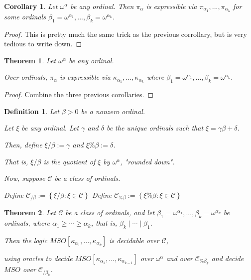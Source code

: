 \documentclass{article}
\newtheorem{theorem}{Theorem}
\newtheorem{corollary}{Corollary}
\newtheorem{definition}{Definition}
\newcommand{\brackets}[1]{\left[ {#1} \right]}
\newcommand{\braces}[1]{\left\{ {#1} \right\}}
\newcommand{\setcomp}[1]{\braces{#1}}
\newcommand{\kk}[1]{{\kappa}_{#1}}
\newcommand{\pp}[1]{{\pi}_{#1}}
\newcommand{\CC}{\mathcal{C}}
\begin{document}
\begin{corollary}
    Let $\omega^\alpha$ be any ordinal.
    Then $\pp{\alpha}$ is expressible via $\pp{\alpha_1}, ..., \pp{\alpha_k}$
    for some ordinals
    $\beta_1 = \omega^{\alpha_1}, ..., \beta_k = \omega^{\alpha_k}$.
\end{corollary}

\begin{proof}
    This is pretty much the same trick as the previous corrollary,
    but is very tedious to write down.
\end{proof}

\begin{theorem}
    Let $\omega^\alpha$ be any ordinal.

    Over ordinals, $\pp{\alpha}$ is expressible via
    $\kk{\alpha_1}, ..., \kk{\alpha_k}$
    where $\beta_1 = \omega^{\alpha_1}, ..., \beta_k = \omega^{\alpha_k}$.
\end{theorem}

\begin{proof}
    Combine the three previous corollaries.
\end{proof}

\begin{definition}
    Let $\beta > 0$ be a nonzero ordinal.

    Let $\xi$ be any ordinal.
    Let $\gamma$ and $\delta$ be the unique ordinals
    such that $\xi = \gamma \beta + \delta$.

    Then, define $\xi / \beta := \gamma$ and $\xi \% \beta := \delta$.

    That is, $\xi / \beta$ is the quotient of $\xi$ by $\omega^\alpha$, "rounded down".

    Now, suppose $\CC$ be a class of ordinals.

    Define $\CC_{/\beta} := \setcomp{\xi / \beta : \xi \in \CC}$
    Define $\CC_{\% \beta} := \setcomp{\xi \% \beta : \xi \in \CC}$

\end{definition}

\begin{theorem}
    Let $\CC$ be a class of ordinals,
    and let $\beta_1=\omega^{\alpha_1}, ..., \beta_k=\omega^{\alpha_k}$ be ordinals,
    where $\alpha_1 \ge \cdots \ge \alpha_k$, that is, $\beta_k \mid \cdots \mid \beta_1$.
    
    Then the logic $MSO \brackets{\kk{\alpha_1}, ..., \kk{\alpha_k}}$
    is decidable over $\CC$,

    using oracles to decide $MSO \brackets{\kk{\alpha_1}, ..., \kk{\alpha_{k-1}}}$
    over $\omega^\alpha$ and over $\CC_{\% \beta_k}$ and
    decide $MSO$ over $\CC_{/\beta_k}$.
\end{theorem}
\end{document}
